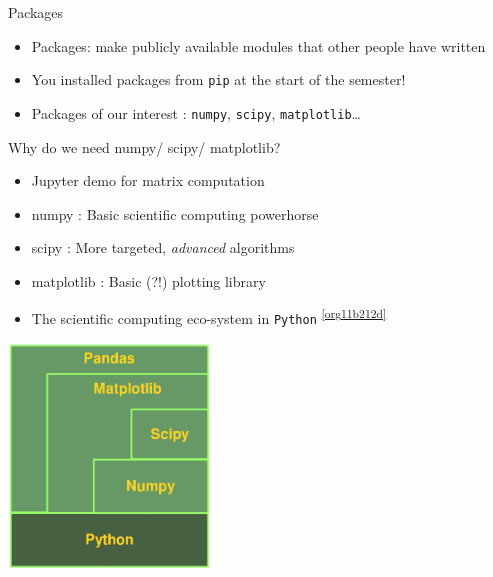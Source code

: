 \documentclass[presentation]{beamer}
\begin{document}
\begin{frame}[label={sec:org5a93d71},fragile]{Packages}
 \begin{itemize}
\item Packages: make publicly available modules that other people have written
\item You installed packages from \texttt{pip} at the start of the semester!
\item Packages of our interest : \texttt{numpy}, \texttt{scipy}, \texttt{matplotlib}\ldots{}
\end{itemize}
\end{frame}
\begin{frame}[label={sec:orgefaa37e},fragile]{Why do we need numpy/ scipy/ matplotlib?}
 \begin{itemize}
\item \alert{Jupyter demo} for matrix computation
\item \alert{numpy} : Basic scientific computing powerhorse
\item \alert{scipy} : More targeted, \emph{advanced} algorithms
\item \alert{matplotlib} : Basic (?!) plotting library
\item The scientific computing eco-system in \texttt{Python} \textsuperscript{\cref{org11b212d}}
\end{itemize}
\begin{center}
\includegraphics[width=0.4\textwidth]{images/python_numerics.png}
\end{center}
\end{frame}

\end{document}
